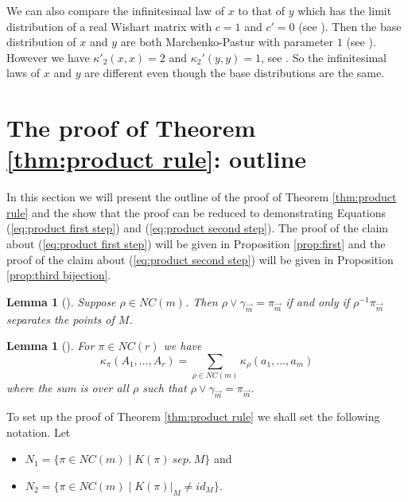 \documentclass[11pt]{amsart}
\newtheorem{lemma}[theorem]{Lemma}
\theoremstyle{definition}
\numberwithin{theorem}{section}
\newcommand{\NC}{\mathit{NC}}
\newcommand{\vm}{{\vec{m}}}
\newcommand{\sep}{\mathit{\ sep.\ }}
\begin{document}
We can also compare the infinitesimal law of $x$ to that of
$y$ which has the limit distribution of a real Wishart
matrix with $c = 1$ and $c' = 0$ (see \cite[Corollary
  18]{mvb}). Then the base distribution of $x$ and $y$ are
both Marchenko-Pastur with parameter $1$ (see
\cite[Def.~2.11]{ms}). However we have $\kappa'_2(x, x) = 2$
and $\kappa_2'(y, y) = 1$, see \cite[Cor.~18]{mvb}. So the
infinitesimal laws of $x$ and $y$ are different even though
the base distributions are the same.



\section{The proof of Theorem \ref{thm:product rule}: outline}
\label{sec:product rule outline}

In this section we will present the outline of the proof of
Theorem \ref{thm:product rule} and the show that the proof
can be reduced to demonstrating Equations (\ref{eq:product
  first step}) and (\ref{eq:product second step}). The proof
of the claim about (\ref{eq:product first step}) will be
given in Proposition \ref{prop:first} and the proof of the
claim about (\ref{eq:product second step}) will be given in
Proposition \ref{prop:third bijection}.

\begin{lemma}[{\cite[Lemma 14]{mst}}]\label{lemma:separation lemma}
Suppose $\rho \in \NC(m)$. Then $\rho \vee \gamma_\vm =
\pi_\vm$ if and only if $\rho^{-1}\pi_\vm$ separates the
points of $M$.
\end{lemma}

\begin{lemma}[{\cite[Prop. 11.12]{ns}}]\label{lemma:zeroth order product}
For $\pi \in \NC(r)$ we have 
\begin{equation}\label{eq:product rule}
\kappa_\pi(A_1, \dots, A_r)
=
\sum_{\rho \in \NC(m)} \kappa_\rho(a_1, \dots, a_m)
\end{equation}
where the sum is over all $\rho$ such that $\rho \vee \gamma_\vm = \pi_\vm$. 
\end{lemma}

\noindent
To set up the proof of Theorem \ref{thm:product rule} we
shall set the following notation. Let



\begin{itemize}\itemsep1em
\item
$N_1 = \{ \pi \in \NC(m) \mid K(\pi) \sep M \}$ and  

\item
$N_2 = \{ \pi \in \NC(m) \mid K(\pi)|_M \not= \textit{id}_M\}$.
\end{itemize} 
\end{document}
